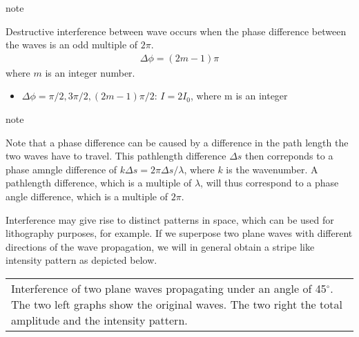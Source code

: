 \documentclass[letterpaper,10pt,english]{sphinxmanual}
\begin{document}
\begin{sphinxadmonition}{note}{}\unskip
{}

Destructive interference between wave occurs when the phase difference between the waves is an odd multiple of \(2\pi\).
\begin{equation*}
\begin{split}\Delta \phi=(2m-1)\pi\end{split}
\end{equation*}
where \(m\) is an integer number.
\end{sphinxadmonition}

\begin{itemize}
\item {} 
\(\Delta \phi=\pi/2,3\pi/2,(2m-1)\pi/2\): \(I=2I_0\), where m is an integer

\end{itemize}

\begin{sphinxadmonition}{note}{}\unskip
{}

Note that a phase difference can be caused by a difference in the path length the two waves have to travel. This pathlength difference \(\Delta s\) then correponds to a phase amngle difference of \(k\Delta s=2\pi\Delta s /\lambda\), where \(k\) is the wavenumber. A pathlength difference, which is a multiple of \(\lambda\), will thus correspond to a phase angle difference, which is a multiple of \(2\pi\).
\end{sphinxadmonition}

Interference may give rise to distinct patterns in space, which can be used for lithography purposes, for example. If we superpose two plane waves with different directions of the wave propagation, we will in general obtain a stripe like intensity pattern as depicted below.


\begin{savenotes}\sphinxattablestart
\centering
\begin{tabulary}{\linewidth}[t]{|T|}
\hline
\sphinxstyletheadfamily 
{}
\\
\hline
{} Interference of two plane waves propagating under an angle of 45\(^{\circ}\). The two left graphs show the original waves. The two right the total amplitude and the intensity pattern.
\\
\hline
\end{tabulary}
\par
\sphinxattableend\end{savenotes}
\end{document}
